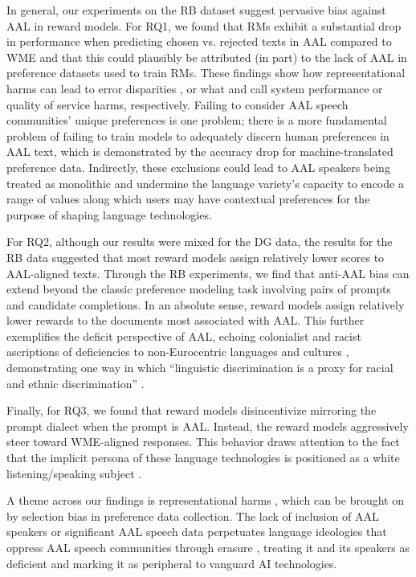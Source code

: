 In general, our experiments on the \textsc{RB} dataset suggest pervasive bias against AAL in reward models. For RQ1, we found that RMs exhibit a substantial drop in performance when predicting chosen vs. rejected texts in AAL compared to WME and that this could plausibly be attributed (in part) to the lack of AAL in preference datasets used to train RMs.
These findings show how representational harms can lead to error disparities \cite{shah_predictive_2020}, or what \citet{blodgett_language_2020} and \citet{shelby_sociotechnical_2023} call system performance or quality of service harms, respectively. Failing to consider AAL speech communities' unique preferences is one problem; there is a more fundamental problem of failing to train models to adequately discern human preferences in AAL text, which is demonstrated by the accuracy drop for machine-translated preference data. Indirectly, these exclusions could lead to AAL speakers being treated as monolithic and undermine the language variety's capacity to encode a range of values along which users may have contextual preferences for the purpose of shaping language technologies.

For RQ2, although our results were mixed for the \textsc{DG} data, the results for the \textsc{RB} data suggested that most reward models assign relatively lower scores to AAL-aligned texts. Through the \textsc{RB} experiments, we find that anti-AAL bias can extend beyond the classic preference modeling task involving pairs of prompts and candidate completions. In an absolute sense, reward models assign relatively lower rewards to the documents most associated with AAL. This further exemplifies the deficit perspective of AAL, echoing colonialist and racist ascriptions of deficiencies to non-Eurocentric languages and cultures \cite{rosa_unsettling_2017}, demonstrating one way in which ``linguistic discrimination is a proxy for racial and ethnic discrimination'' \cite{wolfram_chapter_2018}. 

Finally, for RQ3, we found that reward models disincentivize mirroring the prompt dialect when the prompt is AAL. Instead, the reward models aggressively steer toward WME-aligned responses. This behavior draws attention to the fact that the implicit persona of these language technologies is positioned as a white listening/speaking subject \citet{rosa_unsettling_2017}. 

A theme across our findings is representational harms \cite{blodgett_language_2020, shelby_sociotechnical_2023}, which can be brought on by selection bias \cite{shah_predictive_2020} in preference data collection. The lack of inclusion of AAL speakers or significant AAL speech data perpetuates language ideologies that oppress AAL speech communities through erasure \cite{roche_articulating_2019}, treating it and its speakers as deficient and marking it as peripheral to vanguard AI technologies. 

